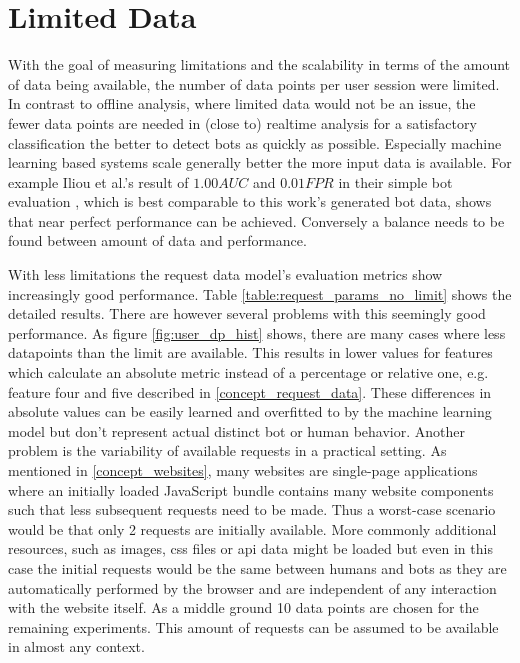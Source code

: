 \documentclass[
    fontsize=12pt,
    headings=small,
    parskip=half,           %
    bibliography=totoc,
    numbers=noenddot,       %
    open=any,               %
    final,                   %
    table
]{scrreprt}
\begin{document}
\section{Limited Data}

With the goal of measuring limitations and the scalability in terms of the amount of data being available, the number of data points per user session were limited. In contrast to offline analysis, where limited data would not be an issue, the fewer data points are needed in (close to) realtime analysis for a satisfactory classification the better to detect bots as quickly as possible. Especially machine learning based systems scale generally better the more input data is available. For example Iliou et al.'s result of $1.00 AUC$ and $0.01 FPR$ in their simple bot evaluation \cite{10.1145/3339252.3339267}, which is best comparable to this work's generated bot data, shows that near perfect performance can be achieved. Conversely a balance needs to be found between amount of data and performance.

With less limitations the request data model's evaluation metrics show increasingly good performance. Table \ref{table:request_params_no_limit} shows the detailed results. There are however several problems with this seemingly good performance. As figure \ref{fig:user_dp_hist} shows, there are many cases where less datapoints than the limit are available. This results in lower values for features which calculate an absolute metric instead of a percentage or relative one, e.g. feature four and five described in \ref{concept_request_data}. These differences in absolute values can be easily learned and overfitted to by the machine learning model but don't represent actual distinct bot or human behavior.
Another problem is the variability of available requests in a practical setting. As mentioned in \ref{concept_websites}, many websites are single-page applications where an initially loaded JavaScript bundle contains many website components such that less subsequent requests need to be made. Thus a worst-case scenario would be that only 2 requests are initially available. More commonly additional resources, such as images, css files or api data might be loaded but even in this case the initial requests would be the same between humans and bots as they are automatically performed by the browser and are independent of any interaction with the website itself. As a middle ground 10 data points are chosen for the remaining experiments. This amount of requests can be assumed to be available in almost any context.
\end{document}
